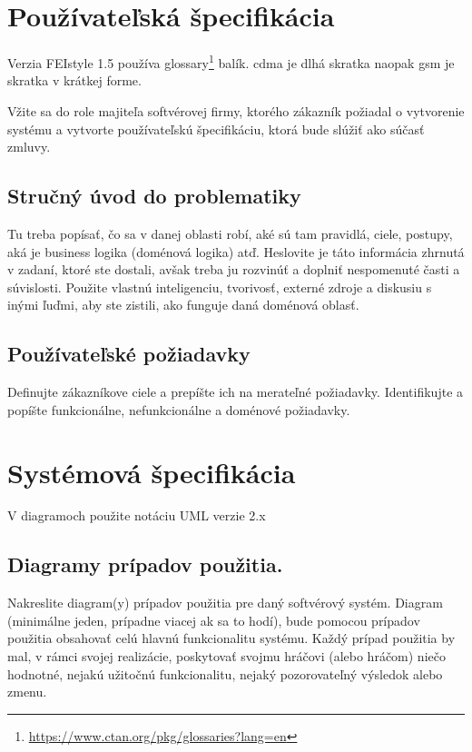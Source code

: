 \section{Používateľská špecifikácia} %
\noindent Verzia FEIstyle 1.5 používa glossary\footnote{\url{https://www.ctan.org/pkg/glossaries?lang=en}} balík.
\acrfull{cdma} je dlhá skratka naopak \acrshort{gsm} je skratka v krátkej forme.

Vžite sa do role majiteľa softvérovej firmy, ktorého zákazník požiadal o vytvorenie systému a vytvorte
používateľskú špecifikáciu, ktorá bude slúžiť ako súčasť zmluvy.

\subsection{Stručný úvod do problematiky}

Tu treba popísať, čo sa v danej oblasti robí, aké sú tam pravidlá,
ciele, postupy, aká je business logika (doménová logika) atď. Heslovite je táto informácia
zhrnutá v zadaní, ktoré ste dostali, avšak treba ju rozvinúť a doplniť nespomenuté časti a
súvislosti. Použite vlastnú inteligenciu, tvorivosť, externé zdroje a diskusiu s inými ľuďmi, aby
ste zistili, ako funguje daná doménová oblasť.

\subsection{Používateľské požiadavky}
Definujte zákazníkove ciele a prepíšte ich na merateľné požiadavky.
Identifikujte a popíšte funkcionálne, nefunkcionálne a doménové požiadavky.


\section{Systémová špecifikácia}
V diagramoch použite notáciu UML verzie 2.x

\subsection{Diagramy prípadov použitia.}
Nakreslite diagram(y) prípadov použitia pre daný softvérový
systém. Diagram (minimálne jeden, prípadne viacej ak sa to hodí), bude pomocou prípadov
použitia obsahovať celú hlavnú funkcionalitu systému. Každý prípad použitia by mal, v rámci
svojej realizácie, poskytovať svojmu hráčovi (alebo hráčom) niečo hodnotné, nejakú užitočnú
funkcionalitu, nejaký pozorovateľný výsledok alebo zmenu.

